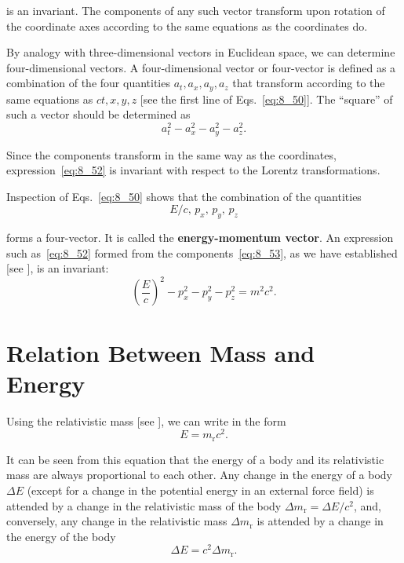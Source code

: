 \noindent
is an invariant. The components of any such vector transform upon rotation of the coordinate axes according to the same equations as the coordinates do.

By analogy with three-dimensional vectors in Euclidean space, we can determine four-dimensional vectors. A four-dimensional vector or four-vector is defined as a combination of the four quantities $a_t, a_x, a_y, a_z$ that transform according to the same equations as $ct, x, y, z$ [see the first line of Eqs.~\eqref{eq:8_50}]. The ``square'' of such a vector should be determined as
\begin{equation}\label{eq:8_52}
	a_t^2 - a_x^2 - a_y^2 - a_z^2.
\end{equation}

\noindent
Since the components transform in the same way as the coordinates, expression~\eqref{eq:8_52} is invariant with respect to the Lorentz transformations.

Inspection of Eqs.~\eqref{eq:8_50} shows that the combination of the quantities
\begin{equation}\label{eq:8_53}
	E/c,\, p_x,\, p_y,\, p_z
\end{equation}

\noindent
forms a four-vector. It is called the \textbf{energy-momentum vector}. An expression such as~\eqref{eq:8_52} formed from the components~\eqref{eq:8_53}, as we have established [see ], is an invariant:
\begin{equation*}
	\left(\frac{E}{c}\right)^2 - p_x^2 - p_y^2 - p_z^2 = m^2c^2.
\end{equation*}

\section{Relation Between Mass and Energy}\label{sec:8_9}

Using the relativistic mass [see ], we can write  in the form
\begin{equation}\label{eq:8_54}
	E = m_{\text{r}}c^2.
\end{equation}

\noindent
It can be seen from this equation that the energy of a body and its relativistic mass are always proportional to each other. Any change in the energy of a body $\Delta E$ (except for a change in the potential energy in an external force field) is attended by a change in the relativistic mass of the body $\Delta m_{\text{r}} = \Delta E/c^2$, and, conversely, any change in the relativistic mass $\Delta m_{\text{r}}$ is attended by a change in the energy of the body
\begin{equation}\label{eq:8_55}
	\Delta E = c^2 \Delta m_{\text{r}}.
\end{equation}

